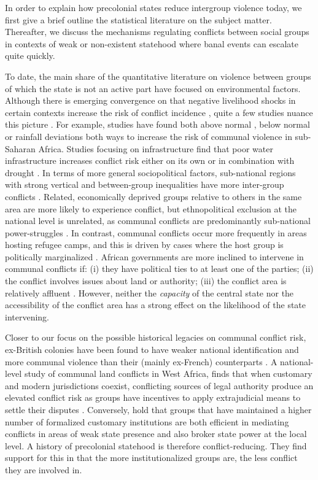In order to explain how precolonial states reduce intergroup violence today, we
first give a brief outline the statistical literature on the subject matter.
Thereafter, we discuss the mechanisms regulating conflicts between social groups
in contexts of weak or non-existent statehood where banal events can escalate 
quite quickly. 

To date, the main share of the quantitative literature on violence between
groups of which the state is not an active part have focused on environmental
factors. Although there is emerging convergence on that negative livelihood
shocks in certain contexts increase the risk of conflict incidence
\citep{Fjelde2012, van_Weezel_2019, Petrova_2022}, quite a few studies nuance
this picture \cite[see][for a review]{Theisen_2017}. For example, studies have
found both above normal \cite[see for instance][]{Theisen2012, Witsenburg2012},
below normal \citep{Fjelde2012} or rainfall deviations both ways
\citep{Nordkvelle_2017, Raleigh_2012} to increase the risk of communal violence
in sub-Saharan Africa. Studies focusing on infrastructure find that poor water
infrastructure increases conflict risk either on its own or in combination with
drought \citep{Detges_2017, D_ring_2020}. In terms of more general
sociopolitical factors, sub-national regions with strong vertical and
between-group inequalities have more inter-group conflicts \citep{Fjelde2014}.
Related, economically deprived groups relative to others in the same area are
more likely to experience conflict, but ethnopolitical exclusion at the national
level is unrelated, as communal conflicts are predominantly sub-national
power-struggles \citep{Hillesund_2017}. In contrast, communal conflicts occur
more frequently in areas hosting refugee camps, and this is driven by cases
where the host group is politically marginalized \citep{Fisk_2019}. African
governments are more inclined to intervene in communal conflicts if: (i) they
have political ties to at least one of the parties; (ii) the conflict involves
issues about land or authority; (iii) the conflict area is relatively affluent
\citet{Elfversson2015} . However, neither the \textit{capacity} of the central
state nor the accessibility of the conflict area has a strong effect on the
likelihood of the state intervening.

Closer to our focus on the possible historical legacies on communal conflict
risk, ex-British colonies have been found to have weaker national identification
and more communal violence than their (mainly ex-French) counterparts
\citet{Ali_2018}. A national-level study of communal land conflicts in West
Africa, finds that when customary and modern jurisdictions coexist, conflicting
sources of legal authority produce an elevated conflict risk as groups have
incentives to apply extrajudicial means to settle their disputes
\citet{Eck2014}. Conversely, \citet{Wig2018} hold that groups that have
maintained a higher number of formalized customary institutions are both
efficient in mediating conflicts in areas of weak state presence and also broker
state power at the local level. A history of precolonial statehood is therefore
conflict-reducing. They find support for this in that the more institutionalized
groups are, the less conflict they are involved in.

